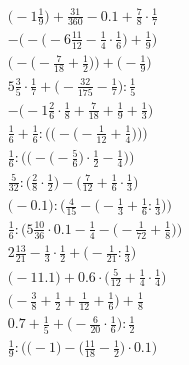 \documentclass[8pt]{article}
\begin{document}
\begin{align}
\big(-1\frac{1}{9}\big) + \frac{31}{360} - 0.1 + \frac{7}{8} \cdot \frac{1}{7} \\
-\Big(-\big(-6\frac{11}{12} - \frac{1}{4} \cdot \frac{1}{6}\big) + \frac{1}{9}\Big) \\
\Big(-\big(-\frac{7}{18} + \frac{1}{2}\big)\Big) + \Big(-\frac{1}{9}\Big) \\
5\frac{3}{5} \cdot \frac{1}{7} + \big(-\frac{32}{175} - \frac{1}{7}\big) : \frac{1}{5} \\
-\big(-1\frac{2}{6} \cdot \frac{1}{8} + \frac{7}{18} + \frac{1}{9} + \frac{1}{3}\big) \\
\frac{1}{6} + \frac{1}{6} : \bigg(\Big(-\big(-\frac{1}{12} + \frac{1}{4}\big)\Big)\bigg) \\
\frac{1}{6} : \bigg(\Big(-\big(-\frac{5}{6}\big) \cdot \frac{1}{2} - \frac{1}{4}\Big)\bigg) \\
\frac{5}{32} : \big(\frac{2}{8} \cdot \frac{1}{2}\big) - \big(\frac{7}{12} + \frac{1}{6} \cdot \frac{1}{3}\big) \\
\Big(-0.1\Big) : \Big(\frac{4}{15} - \big(-\frac{1}{3} + \frac{1}{6} : \frac{1}{3}\big)\Big) \\
\frac{1}{6} : \Big(5\frac{10}{36} \cdot 0.1 - \frac{1}{4} - \big(-\frac{1}{72} + \frac{1}{8}\big)\Big) \\
2\frac{13}{21} - \frac{1}{3} \cdot \frac{1}{2} + \big(-\frac{1}{21} : \frac{1}{3}\big) \\
\big(-11.1\big) + 0.6 \cdot \big(\frac{5}{12} + \frac{1}{4} \cdot \frac{1}{4}\big) \\
\big(-\frac{3}{8} + \frac{1}{2} + \frac{1}{12} + \frac{1}{6}\big) + \frac{1}{8} \\
0.7 + \frac{1}{5} + \big(-\frac{6}{20} \cdot \frac{1}{6}\big) : \frac{1}{2} \\
\frac{1}{9} : \Big(\big(-1\big) - \big(\frac{11}{18} - \frac{1}{2}\big) \cdot 0.1\Big)
\end{align}
\end{document}

